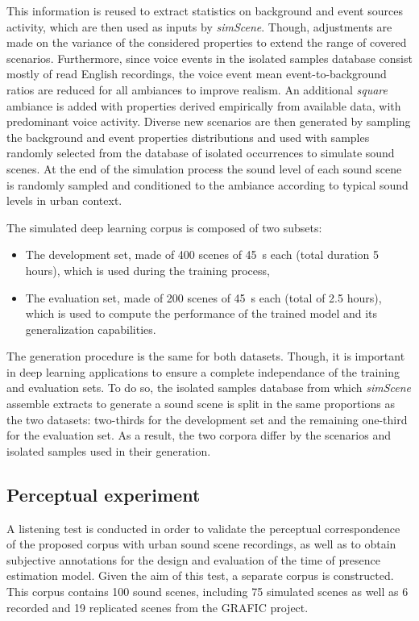 \documentclass[twocolumn]{article}
\begin{document}
This information is reused to extract statistics on background and event sources activity, which are then used as inputs by \textit{simScene}. Though, adjustments are made on the variance of the considered properties to extend the range of covered scenarios. Furthermore, since voice events in the isolated samples database consist mostly of read English recordings, the voice event mean event-to-background ratios are reduced for all ambiances to improve realism. An additional \textit{square} ambiance is added with properties derived empirically from available data, with predominant voice activity. Diverse new scenarios are then generated by sampling the background and event properties distributions and used with samples randomly selected from the database of isolated occurrences to simulate sound scenes. At the end of the simulation process the sound level of each sound scene is randomly sampled and conditioned to the ambiance according to typical sound levels in urban context.

The simulated deep learning corpus is composed of two subsets:
\begin{itemize}
\item The development set, made of 400 scenes of 45~s each (total duration 5 hours), which is used during the training process,
\item The evaluation set, made of 200 scenes of 45~s each (total of 2.5 hours), which is used to compute the performance of the trained model and its generalization capabilities.
\end{itemize}

The generation procedure is the same for both datasets. Though, it is important in deep learning applications to ensure a complete independance of the training and evaluation sets. To do so, the isolated samples database from which \textit{simScene} assemble extracts to generate a sound scene is split in the same proportions as the two datasets: two-thirds for the development set and the remaining one-third for the evaluation set. As a result, the two corpora differ by the scenarios and isolated samples used in their generation.

\subsection{Perceptual experiment}
\label{sec:data_exp}

A listening test is conducted in order to validate the perceptual correspondence of the proposed corpus with urban sound scene recordings, as well as to obtain subjective annotations for the design and evaluation of the time of presence estimation model. Given the aim of this test, a separate corpus is constructed. This corpus contains 100 sound scenes, including 75 simulated scenes as well as 6 recorded and 19 replicated scenes from the GRAFIC project.
\end{document}
